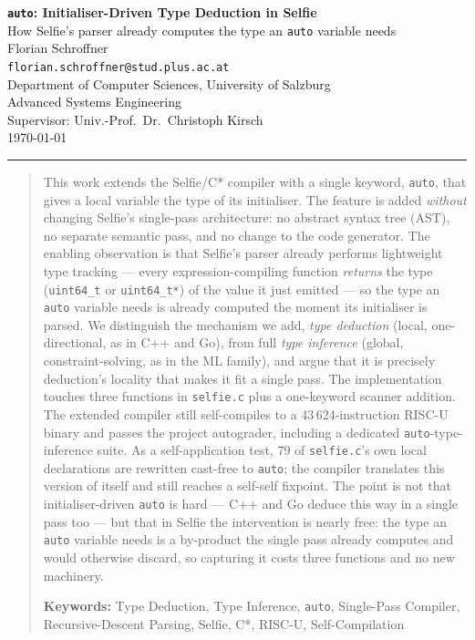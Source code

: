 \documentclass[a4paper,11pt]{article}
\begin{document}
\begin{center}
  {\LARGE \textbf{\textcolor{headcolor}{\texttt{auto}: Initialiser-Driven Type Deduction in Selfie}}}\\[0.4cm]
  {\large How Selfie's parser already computes the type an \texttt{auto} variable needs}\\[0.6cm]
  {\normalsize
    Florian Schroffner\\
    \texttt{florian.schroffner@stud.plus.ac.at}\\
    Department of Computer Sciences, University of Salzburg\\
    Advanced Systems Engineering\\
    Supervisor: Univ.-Prof.\ Dr.\ Christoph Kirsch\\[0.2cm]
    \today
  }
\end{center}

\vspace{0.3cm}
\hrule height 1pt
\vspace{0.5cm}

\begin{abstract}
\noindent
This work extends the Selfie/C* compiler with a single keyword, \texttt{auto}, that gives a local variable the type of its initialiser. The feature is added \emph{without} changing Selfie's single-pass architecture: no abstract syntax tree (AST), no separate semantic pass, and no change to the code generator. The enabling observation is that Selfie's parser already performs lightweight type tracking --- every expression-compiling function \emph{returns} the type (\texttt{uint64\_t} or \texttt{uint64\_t*}) of the value it just emitted --- so the type an \texttt{auto} variable needs is already computed the moment its initialiser is parsed. We distinguish the mechanism we add, \emph{type deduction} (local, one-directional, as in C++ and Go), from full \emph{type inference} (global, constraint-solving, as in the ML family), and argue that it is precisely deduction's locality that makes it fit a single pass. The implementation touches three functions in \texttt{selfie.c} plus a one-keyword scanner addition. The extended compiler still self-compiles to a 43\,624-instruction RISC-U binary and passes the project autograder, including a dedicated \texttt{auto}-type-inference suite. As a self-application test, 79 of \texttt{selfie.c}'s own local declarations are rewritten cast-free to \texttt{auto}; the compiler translates this version of itself and still reaches a self-self fixpoint. The point is not that initialiser-driven \texttt{auto} is hard --- C++ and Go deduce this way in a single pass too --- but that in Selfie the intervention is nearly free: the type an \texttt{auto} variable needs is a by-product the single pass already computes and would otherwise discard, so capturing it costs three functions and no new machinery.

\vspace{4pt}
\noindent\textbf{Keywords:} Type Deduction, Type Inference, \texttt{auto}, Single-Pass Compiler, Recursive-Descent Parsing, Selfie, C*, RISC-U, Self-Compilation
\end{abstract}
\end{document}
